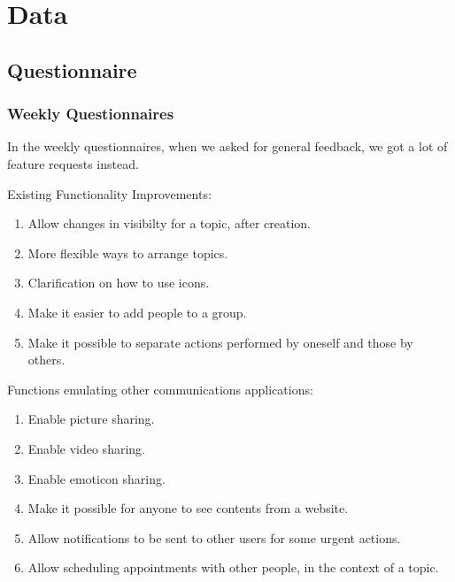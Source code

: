 \chapter{Data}
\section{Questionnaire}

\subsection{Weekly Questionnaires}
  In the weekly questionnaires, when we asked for general feedback,
  we got a lot of feature requests instead.

  Existing Functionality Improvements:
  \begin{enumerate}
  \item Allow changes in visibilty for a topic, after creation.
  \item More flexible ways to arrange topics.
  \item Clarification on how to use icons.
  \item Make it easier to add people to a group.
  \item Make it possible to separate actions performed by oneself
  and those by others.
  \end{enumerate}

  Functions emulating other communications applications:
  \begin{enumerate}
  \item Enable picture sharing.
  \item Enable video sharing.
  \item Enable emoticon sharing.
  \item Make it possible for anyone to see contents from a website.
  \item Allow notifications to be sent to other users for some urgent actions.
  \item Allow scheduling appointments with other people,
  in the context of a topic.
  \end{enumerate}



